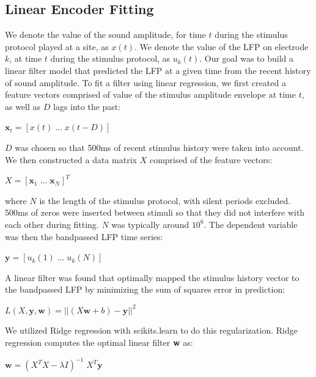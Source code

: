 \subsection{Linear Encoder Fitting}

We denote the value of the sound amplitude, for time $t$ during the stimulus protocol played at a site, as $x(t)$. We denote the value of the LFP on electrode $k$, at time $t$ during the stimulus protocol, as $u_k (t)$. Our goal was to build a linear filter model that predicted the LFP at a given time from the recent history of sound amplitude. To fit a filter using linear regression, we first created a feature vectors comprised of value of the stimulus amplitude envelope at time $t$, as well as $D$ lags into the past:

\begin{center}
$\textbf{x}_t = [x(t) \; ... \; x(t-D)]$
\end{center}

$D$ was chosen so that 500ms of recent stimulus history were taken into account. We then constructed a data matrix $X$ comprised of the feature vectors:

\begin{center}
$X = [\textbf{x}_1 \; ... \; \textbf{x}_{N}]^T$
\end{center}

where $N$ is the length of the stimulus protocol, with silent periods excluded. 500ms of zeros were inserted between stimuli so that they did not interfere with each other during fitting. $N$ was typically around $10^6$. The dependent variable was then the bandpassed LFP time series:

\begin{center}
$\textbf{y} = [u_k (1) \; ... \; u_k (N)]$
\end{center}

A linear filter was found that optimally mapped the stimulus history vector to the bandpassed LFP by minimizing the sum of squares error in prediction:

\begin{center}
$L(X, \textbf{y}, \textbf{w}) = || (X\textbf{w} + b) - \textbf{y} ||^2$ 
\end{center}

We utilized Ridge regression with scikits.learn to do this regularization. Ridge regression computes the optimal linear filter \textbf{w} as:

\begin{center}
$ \textbf{w} = (X^T X - \lambda I)^{-1} \; X^T \textbf{y}$
\end{center}

